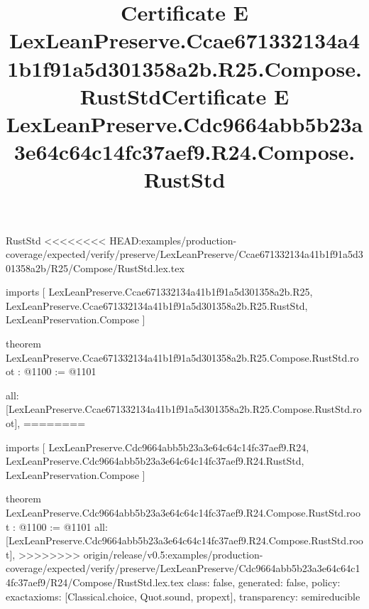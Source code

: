 \begin{lexlean}{RustStd}
<<<<<<<< HEAD:examples/production-coverage/expected/verify/preserve/LexLeanPreserve/Ccae671332134a41b1f91a5d301358a2b/R25/Compose/RustStd.lex.tex
\title{Certificate E LexLeanPreserve.Ccae671332134a41b1f91a5d301358a2b.R25.Compose.RustStd}
\begin{coremodule}
imports [
  LexLeanPreserve.Ccae671332134a41b1f91a5d301358a2b.R25,
  LexLeanPreserve.Ccae671332134a41b1f91a5d301358a2b.R25.RustStd,
  LexLeanPreservation.Compose
]

theorem LexLeanPreserve.Ccae671332134a41b1f91a5d301358a2b.R25.Compose.RustStd.root : @1100 := @1101 {
  all: [LexLeanPreserve.Ccae671332134a41b1f91a5d301358a2b.R25.Compose.RustStd.root],
========
\title{Certificate E LexLeanPreserve.Cdc9664abb5b23a3e64c64c14fc37aef9.R24.Compose.RustStd}
\begin{coremodule}
imports [
  LexLeanPreserve.Cdc9664abb5b23a3e64c64c14fc37aef9.R24,
  LexLeanPreserve.Cdc9664abb5b23a3e64c64c14fc37aef9.R24.RustStd,
  LexLeanPreservation.Compose
]

theorem LexLeanPreserve.Cdc9664abb5b23a3e64c64c14fc37aef9.R24.Compose.RustStd.root : @1100 := @1101 {
  all: [LexLeanPreserve.Cdc9664abb5b23a3e64c64c14fc37aef9.R24.Compose.RustStd.root],
>>>>>>>> origin/release/v0.5:examples/production-coverage/expected/verify/preserve/LexLeanPreserve/Cdc9664abb5b23a3e64c64c14fc37aef9/R24/Compose/RustStd.lex.tex
  class: false,
  generated: false,
  policy: exact{axioms: [Classical.choice, Quot.sound, propext]},
  transparency: semireducible
}


\end{coremodule}}
\end{coremodule}
\end{lexlean}
